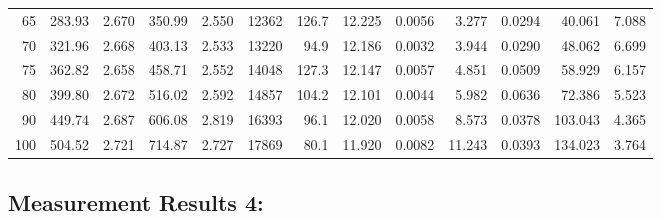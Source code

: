 \documentclass[10pt]{article}
\begin{document}
{\begin{tabular}{|r|rr|rr|rr|rr|rr|r|r|}
       65 &       283.93 &        2.670 &       350.99 &        2.550 &        12362 &        126.7 &       12.225 &       0.0056 &        3.277 &       0.0294 &       40.061 &        7.088 \\
       70 &       321.96 &        2.668 &       403.13 &        2.533 &        13220 &         94.9 &       12.186 &       0.0032 &        3.944 &       0.0290 &       48.062 &        6.699 \\
       75 &       362.82 &        2.658 &       458.71 &        2.552 &        14048 &        127.3 &       12.147 &       0.0057 &        4.851 &       0.0509 &       58.929 &        6.157 \\
       80 &       399.80 &        2.672 &       516.02 &        2.592 &        14857 &        104.2 &       12.101 &       0.0044 &        5.982 &       0.0636 &       72.386 &        5.523 \\
       90 &       449.74 &        2.687 &       606.08 &        2.819 &        16393 &         96.1 &       12.020 &       0.0058 &        8.573 &       0.0378 &      103.043 &        4.365 \\
      100 &       504.52 &        2.721 &       714.87 &        2.727 &        17869 &         80.1 &       11.920 &       0.0082 &       11.243 &       0.0393 &      134.023 &        3.764 \\
\hline
\end{tabular}
}



\subsection*{\large \bf Measurement Results 4:}
\end{document}
